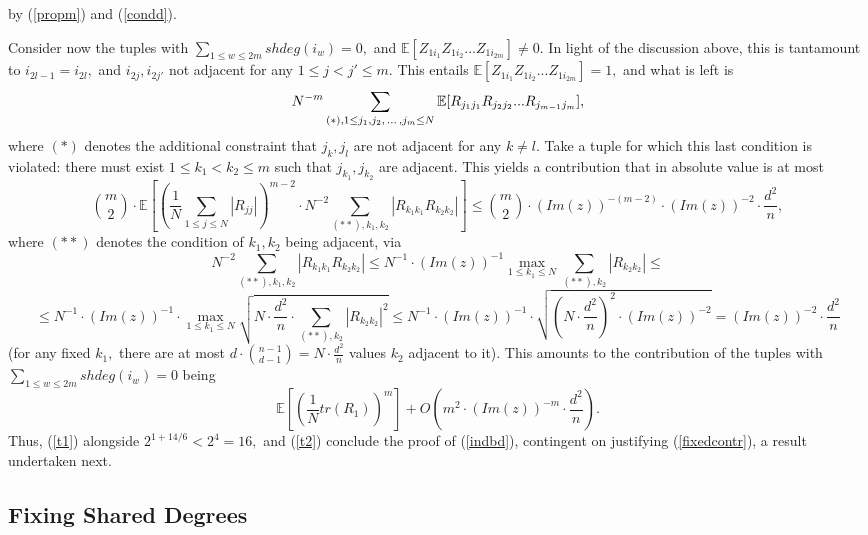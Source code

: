 \documentclass{article}
\numberwithin{equation}{section}
\begin{document}
by (\ref{propm}) and (\ref{condd}). %
\par
Consider now the tuples with \(\sum_{1 \leq w \leq 2m}{shdeg(i_w)}=0,\) and \(\mathbb{E}[Z_{1i_1}Z_{1i_2}...Z_{1i_{2m}}] \ne 0.\) In light of the discussion above, this is tantamount to \(i_{2l-1}=i_{2l},\) and \(i_{2j},i_{2j'}\) not adjacent for any \(1 \leq j<j'\leq m.\) This entails \(\mathbb{E}[Z_{1i_1}Z_{1i_2}...Z_{1i_{2m}}]=1,\) and what is left is
\[N^{-m}\sum_{(*),1 \leq j_1,j_2,\hspace{0.05cm}...\hspace{0.05cm},j_{m} \leq N}{\mathbb{E}[R_{j_1j_1}R_{j_2j_2}...R_{j_{m-1}j_{m}}]},\]
where \((*)\) denotes the additional constraint that \(j_k,j_l\) are not adjacent for any \(k \neq l.\) %
Take a tuple for which this last condition is violated: there must exist \(1 \leq k_1<k_2 \leq m\) such that \(j_{k_1},j_{k_2}\) are adjacent. This yields a contribution that in absolute value is at most
\[\binom{m}{2} \cdot \mathbb{E}[(\frac{1}{N}\sum_{1 \leq j \leq N}{|R_{jj}|})^{m-2} \cdot N^{-2}\sum_{(**),k_1,k_2}{|R_{k_1k_1}R_{k_2k_2}|}] \leq \binom{m}{2} \cdot (Im(z))^{-(m-2)} \cdot (Im(z))^{-2} \cdot \frac{d^2}{n},\]
where \((**)\) denotes the condition of \(k_1,k_2\) being adjacent, via
\[N^{-2}\sum_{(**),k_1,k_2}{|R_{k_1k_1}R_{k_2k_2}|} \leq N^{-1} \cdot (Im(z))^{-1}\max_{1 \leq k_1 \leq N}{\sum_{(**),k_2}{|R_{k_2k_2}|}} \leq\]
\[\leq N^{-1} \cdot (Im(z))^{-1} \cdot \max_{1 \leq k_1 \leq N}{\sqrt{N \cdot \frac{d^2}{n} \cdot \sum_{(**),k_2}{|R_{k_2k_2}|^2}}} \leq N^{-1} \cdot (Im(z))^{-1} \cdot \sqrt{(N \cdot \frac{d^2}{n})^2 \cdot (Im(z))^{-2}}=(Im(z))^{-2} \cdot \frac{d^2}{n}\]
(for any fixed \(k_1,\) there are at most \(d \cdot \binom{n-1}{d-1}=N \cdot \frac{d^2}{n}\) values \(k_2\) adjacent to it). This amounts to the contribution of the tuples with \(\sum_{1 \leq w \leq 2m}{shdeg(i_w)}=0\) being
\begin{equation}\tag{\(T2\)}\label{t2}
    \mathbb{E}[(\frac{1}{N}tr(R_1))^m]+O(m^2 \cdot (Im(z))^{-m} \cdot \frac{d^2}{n}).
\end{equation}
Thus, (\ref{t1}) alongside \(2^{1+14/6}<2^4=16,\) and (\ref{t2}) conclude the proof of (\ref{indbd}), contingent on justifying (\ref{fixedcontr}), a result undertaken next.

\subsection{Fixing Shared Degrees}\label{subsect4}
\end{document}
